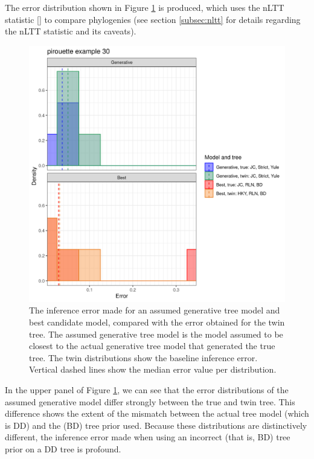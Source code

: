 The error distribution shown in Figure \ref{fig:example_30}
is produced, which uses the nLTT 
statistic [\cite{janzen2015approximate}] to compare phylogenies (see 
section \ref{subsec:nltt} for details regarding the nLTT statistic
and its caveats).

\begin{figure}[H]
  \includegraphics[width=\textwidth]{pirouette_example_30/errors.png}
  \caption{
    The inference error made 
    for an assumed generative tree model and best candidate model,
    compared with the error obtained for the twin tree.
    The assumed generative tree model is the model assumed to be closest to
    the actual generative tree model that generated the true tree.
    The twin distributions show the baseline inference error.
    Vertical dashed lines show the median error value per distribution.
  }
  \label{fig:example_30}
\end{figure}

In the upper panel of Figure \ref{fig:example_30},
we can see that the error distributions of the assumed generative model
differ strongly between the true and twin tree. 
This difference shows the extent of the mismatch between
the actual tree model (which is DD) and the (BD) tree prior used.
Because these distributions are distinctively different,
the inference error made when using an 
incorrect (that is, BD) tree prior on a DD tree
is profound.

